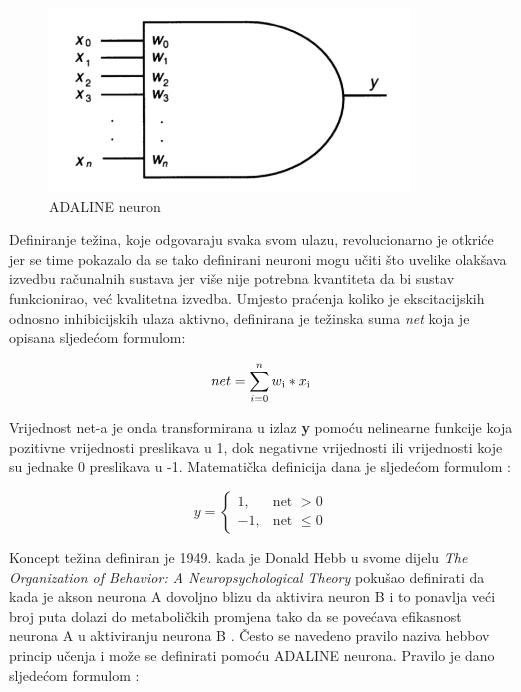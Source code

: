 \documentclass[times, utf8, zavrsni]{fer}
\begin{document}
\begin{figure}[H]
    \centering
    \includegraphics{img/adaline-neuron.png}
    \caption[Caption for LOF]{ADALINE neuron\footnotemark}
    \label{fig:adaline-neuron}
\end{figure}

Definiranje težina, koje odgovaraju svaka svom ulazu, revolucionarno je otkriće jer se time pokazalo da se tako definirani neuroni mogu učiti što uvelike olakšava izvedbu računalnih sustava jer više nije potrebna kvantiteta da bi sustav funkcionirao, već kvalitetna izvedba. Umjesto praćenja koliko je ekscitacijskih odnosno inhibicijskih ulaza aktivno, definirana je težinska suma \textit{net} koja je opisana sljedećom formulom:

\begin{equation}
    \label{net:eq}
    \text{$net = \sum\limits_{i=0}^n w\textsubscript{i} * x\textsubscript{i}$}
\end{equation}

Vrijednost net-a je onda transformirana u izlaz \textbf{y} pomoću nelinearne funkcije koja pozitivne vrijednosti preslikava u 1, dok negativne vrijednosti ili vrijednosti koje su jednake 0 preslikava u -1. Matematička definicija dana je sljedećom formulom \citep{picton2000}:

\begin{equation}
\label{step:eq}
    y = 
    \begin{cases}
        1, & \text{net $>0$} \\
        -1, & \text{net $\leq 0$}
    \end{cases}
\end{equation}

\bigskip

Koncept težina definiran je 1949. kada je Donald Hebb u svome dijelu \textit{The Organization of Behavior: A Neuropsychological Theory} pokušao definirati da kada je akson neurona A dovoljno blizu da aktivira neuron B i to ponavlja veći broj puta dolazi do metaboličkih promjena tako da se povećava efikasnost neurona A u aktiviranju neurona B \citep{hebb}. Često se navedeno pravilo naziva hebbov princip učenja i može se definirati pomoću ADALINE neurona. Pravilo je dano sljedećom formulom \citep{picton2000}:
\end{document}
